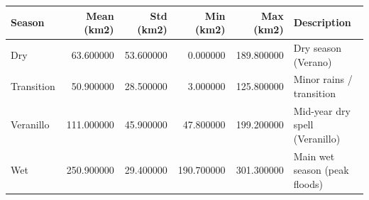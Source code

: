 \begin{tabular}{lrrrrl}
\toprule
Season & Mean (km2) & Std (km2) & Min (km2) & Max (km2) & Description \\
\midrule
Dry & 63.600000 & 53.600000 & 0.000000 & 189.800000 & Dry season (Verano) \\
Transition & 50.900000 & 28.500000 & 3.000000 & 125.800000 & Minor rains / transition \\
Veranillo & 111.000000 & 45.900000 & 47.800000 & 199.200000 & Mid-year dry spell (Veranillo) \\
Wet & 250.900000 & 29.400000 & 190.700000 & 301.300000 & Main wet season (peak floods) \\
\bottomrule
\end{tabular}
